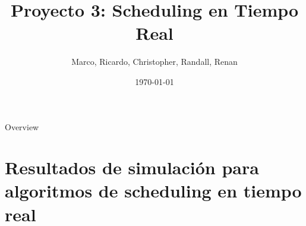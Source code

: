 \documentclass[xcolor=table]{beamer}
\title[Proyecto 3: Scheduling en Tiempo Real]{Proyecto 3: Scheduling en Tiempo Real} %
\author{Marco, Ricardo, Christopher, Randall, Renan} %
\institute[Maestria en Ciencias de la Computacion] %
{
Tecnologico de Costa Rica\\ %
\medskip
}
\date{\today} %
\begin{document}
\begin{frame}
\titlepage %
\end{frame}

\begin{frame}{Overview} %
\tableofcontents %
\end{frame}



\section{Resultados de simulación para algoritmos de scheduling en tiempo real}





\end{document}
